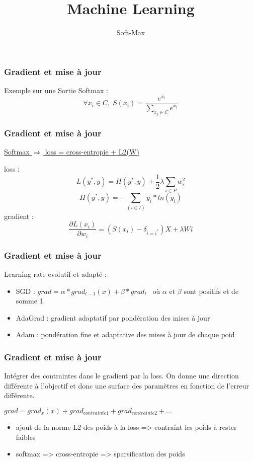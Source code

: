 \documentclass{formation}
\title{Machine Learning}
\subtitle{Soft-Max}
\begin{document}
\maketitle

\begin{frame}
  \frametitle{Gradient et mise à jour}
  Exemple sur une Sortie Softmax :
  \[
  \forall x_i \in C,\; S(x_i) = \frac{e^{x_i}}{\sum_{x_j \in C}e^{x_j}}
  \]
\end{frame}

\begin{frame}
  \frametitle{Gradient et mise à jour}
  \begin{center}
    \underline{Softmax $\Rightarrow$ loss = cross-entropie + L2(W)}
  \end{center}
  loss :
  \[
  L(y^*,y) = H(y^*,y) + \frac{1}{2}\lambda\sum_{i \in P}w_i^2
  \]
  \[
  H(y^*,y) = -\sum_{(i \in I)}y_i*ln(y_i)
  \]
  gradient :
  \[
  \frac{\partial{L(x_i)}}{\partial{w_i}} = ( S(x_i) - \delta_{i=i^*} )X + \lambda Wi
  \]
\end{frame}

\begin{frame}
  \frametitle{Gradient et mise à jour}
  Learning rate evolutif et adapté :
  \begin{itemize}
  \item SGD : $grad = \alpha*grad_{t-1}(x)+\beta*grad_t \;\;\;$où $\alpha$ et $\beta$ sont positifs et de somme 1.
  \item AdaGrad : gradient adaptatif par pondération des mises à jour
  \item Adam : pondération fine et adaptative des mises à jour de chaque poid
  \end{itemize}
\end{frame}


\begin{frame}
  \frametitle{Gradient et mise à jour}
  Intégrer des contraintes dans le gradient par la loss. On donne une direction différente à l'objectif et donc une surface des paramètres en fonction de l'erreur différente.
  \begin{center}
    $grad = grad_x(x) + grad_{contrainte 1} + grad_{contrainte 2} + ...$
  \end{center}
  \begin{itemize}
  \item ajout de la norme L2 des poids à la loss => contraint les poids à rester faibles
  \item softmax => cross-entropie => sparsification des poids
  \end{itemize}
\end{frame}
\end{document}

